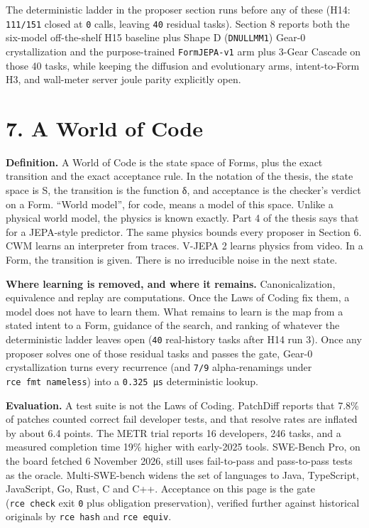 \documentclass[10pt,letterpaper]{article}
\begin{document}
The deterministic ladder in the proposer section runs before any of
these (H14: \texttt{111/151} closed at \texttt{0} calls, leaving
\texttt{40} residual tasks). Section 8 reports both the six-model
off-the-shelf H15 baseline plus Shape D (\texttt{DNULLMM1}) Gear-0
crystallization and the purpose-trained \texttt{FormJEPA-\allowbreak{}v1} arm plus
3-Gear Cascade on those 40 tasks, while keeping the diffusion and
evolutionary arms, intent-to-Form H3, and wall-meter server joule parity
explicitly open.

\section{7. A World of Code}\label{a-world-of-code}

\textbf{Definition.} A World of Code is the state space of Forms, plus
the exact transition and the exact acceptance rule. In the notation of
the thesis, the state space is S, the transition is the function δ, and
acceptance is the checker's verdict on a Form. ``World model'', for
code, means a model of this space. Unlike a physical world model, the
physics is known exactly. Part 4 of the thesis says that for a
JEPA-style predictor. The same physics bounds every proposer in Section
6. CWM learns an interpreter from traces. V-JEPA 2 learns physics from
video. In a Form, the transition is given. There is no irreducible noise
in the next state.

\textbf{Where learning is removed, and where it remains.}
Canonicalization, equivalence and replay are computations. Once the Laws
of Coding fix them, a model does not have to learn them. What remains to
learn is the map from a stated intent to a Form, guidance of the search,
and ranking of whatever the deterministic ladder leaves open
(\texttt{40} real-history tasks after H14 run 3). Once any proposer
solves one of those residual tasks and passes the gate, Gear-0
crystallization turns every recurrence (and \texttt{7/9} alpha-renamings
under \texttt{rce\ fmt\ nameless}) into a \texttt{0.325\ µs}
deterministic lookup.

\textbf{Evaluation.} A test suite is not the Laws of Coding. PatchDiff
reports that 7.8\% of patches counted correct fail developer tests, and
that resolve rates are inflated by about 6.4 points. The METR trial
reports 16 developers, 246 tasks, and a measured completion time 19\%
higher with early-2025 tools. SWE-Bench Pro, on the board fetched 6
November 2026, still uses fail-to-pass and pass-to-pass tests as the
oracle. Multi-SWE-bench widens the set of languages to Java, TypeScript,
JavaScript, Go, Rust, C and C++. Acceptance on this page is the gate
(\texttt{rce\ check} exit \texttt{0} plus obligation preservation),
verified further against historical originals by \texttt{rce\ hash} and
\texttt{rce\ equiv}.
\end{document}
